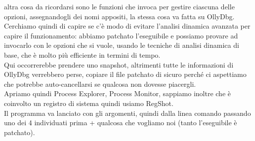 \documentclass[12pt, oneside]{extbook}
\begin{document}
altra cosa da ricordarsi sono le funzioni che invoca per gestire ciascuna delle opzioni, assegnandogli dei nomi appositi, la stessa cosa va fatta su OllyDbg.\\Cerchiamo quindi di capire se c'è modo di evitare l'analisi dinamica avanzata per capire il funzionamento: abbiamo patchato l'eseguibile e possiamo provare ad invocarlo con le opzioni che si vuole, usando le tecniche di analisi dinamica di base, che è molto più efficiente in termini di tempo.\\ Qui occorrerebbe prendere uno snapshot, altrimenti tutte le informazioni di OllyDbg verrebbero perse, copiare il file patchato di sicuro perché ci aspettiamo che potrebbe auto-cancellarsi se qualcosa non dovesse piacergli.\\Apriamo quindi Process Explorer, Process Monitor, sappiamo inoltre che è coinvolto un registro di sistema quindi usiamo RegShot.\\Il programma va lanciato con gli argomenti, quindi dalla linea comando passando uno dei 4 individuati prima + qualcosa che vogliamo noi (tanto l'eseguibile è patchato).
\end{document}
